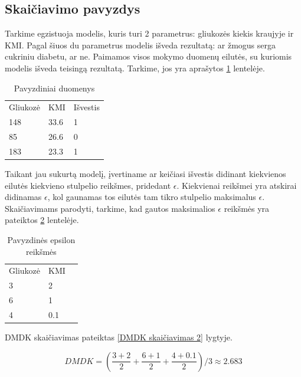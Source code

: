 \documentclass{VUMIFInfBakalaurinis}
\begin{document}
\subsection{Skaičiavimo pavyzdys}
\par Tarkime egzistuoja modelis, kuris turi 2 parametrus: gliukozės kiekis kraujyje ir KMI. Pagal šiuos du parametrus modelis išveda rezultatą: ar žmogus serga cukriniu diabetu, ar ne. Paimamos visos mokymo duomenų eilutės, su kuriomis modelis išveda teisingą rezultatą. Tarkime, jos yra aprašytos \ref{tab:Pavyzdiniai duomenys 1} lentelėje.

\begin{table}[h]
\centering
\begin{tabular}{|l|l|l|}
\cline{1-3}
Gliukozė & KMI  & Išvestis \\\cline{1-3}
148      & 33.6 & 1        \\\cline{1-3}
85       & 26.6 & 0        \\\cline{1-3}
183      & 23.3 & 1        \\\cline{1-3}
\end{tabular}
\caption{Pavyzdiniai duomenys}
\label{tab:Pavyzdiniai duomenys 1}
\end{table}

\par Taikant jau sukurtą modelį, įvertiname ar keičiasi išvestis didinant kiekvienos eilutės kiekvieno stulpelio reikšmes, pridedant $\epsilon$. Kiekvienai reikšmei yra atskirai didinamas $\epsilon$, kol gaunamas tos eilutės tam tikro stulpelio maksimalus $\epsilon$. Skaičiavimams parodyti, tarkime, kad gautos maksimalios $\epsilon$ reikšmės yra pateiktos \ref{tab:my-table2} lentelėje.

\begin{table}[t]
\centering
\begin{tabular}{|l|l|l|}
\cline{1-2}
Gliukozė & KMI \\\cline{1-2}
3      & 2 \\\cline{1-2}
6       & 1 \\\cline{1-2}
4      & 0.1 \\\cline{1-2}
\end{tabular}
\caption{Pavyzdinės epsilon reikšmės}
\label{tab:my-table2}
\end{table}

\par DMDK skaičiavimas pateiktas \eqref{DMDK skaičiavimas 2} lygtyje.

\begin{equation}
DMDK = (\frac{3 + 2}{2} + \frac{6 + 1}{2} + \frac{4 + 0.1}{2})/3 \approx 2.683
\label{DMDK skaičiavimas 2}
\end{equation}
\end{document}
